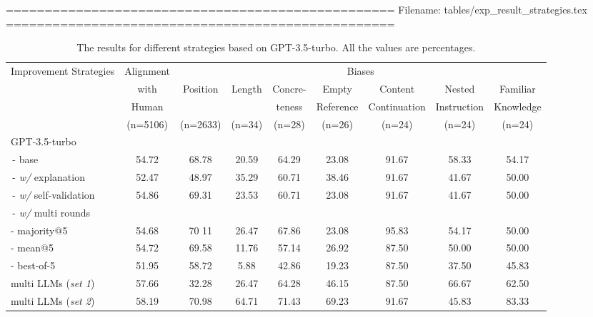 ==================================================
Filename: tables/exp_result_strategies.tex
==================================================
\begin{table}[t]
    \small
    \centering
    \begin{adjustbox}{max width=\textwidth}
    \begin{tabular}{lcccccccc}
        \toprule
        \multirow{4}{*}{Improvement Strategies} & Alignment & \multicolumn{7}{c}{Biases} \\
        & with & \multirow{2}{*}{Position} & \multirow{2}{*}{Length} & Concre- & Empty & Content & Nested & Familiar \\
        & Human & & & teness & Reference & Continuation & Instruction & Knowledge \\
        & (n=5106) & (n=2633) & (n=34) & (n=28) & (n=26) & (n=24) & (n=24) & (n=24) \\
        \midrule
        GPT-3.5-turbo & & & & & & & & \\ 
        \,- base & 54.72 & 68.78 & 20.59 & 64.29 & 23.08 & 91.67 & 58.33 & 54.17 \\
        \,- \textit{w/} explanation & 52.47 & 48.97 & 35.29 & 60.71 & 38.46 & 91.67 & 41.67 & 50.00 \\
        \,- \textit{w/} self-validation & 54.86 & 69.31 & 23.53 & 60.71 & 23.08 & 91.67 & 41.67 & 50.00 \\
        \,- \textit{w/} multi rounds & & & & & & & & \\ 
        \qquad- majority@5 & 54.68 & 70
        11 & 26.47 & 67.86 & 23.08 & 95.83 & 54.17 & 50.00 \\
        \qquad- mean@5 & 54.72 & 69.58 & 11.76 & 57.14 & 26.92 & 87.50 & 50.00 & 50.00 \\
        \qquad- best-of-5 & 51.95 & 58.72 & 5.88 & 42.86 & 19.23 & 87.50 & 37.50 & 45.83 \\
        multi LLMs (\textit{set 1}) & 57.66 & 32.28 & 26.47 & 64.28 & 46.15 & 87.50 & 66.67 & 62.50 \\ 
        multi LLMs (\textit{set 2}) & 58.19 & 70.98 & 64.71 & 71.43 & 69.23 & 91.67 & 45.83 & 83.33 \\
        \bottomrule
    \end{tabular}
    \end{adjustbox}
    \caption{The results for different strategies based on GPT-3.5-turbo. All the values are percentages.}
    \label{tb:exp_results_strategies}
    \vspace{-20pt}
\end{table}


